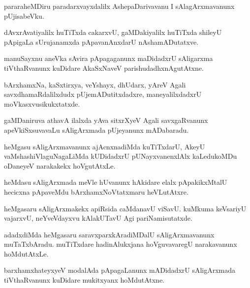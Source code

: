 \documentclass{article}
\begin{document}
\begin{mn}%
pararaheMDiru paradarxvayxdalilx AshepaDarivavanu I sAlagArxmavanunx pUjisabeVku.
\end{mn}

\begin{mn}%
dAvxrAvatiyalilx huTiTxda cakarxvU, gaMDakiyalilx huTiTxda shileyU pApigaLa sUrujanamxda 
pApavanAnxdarU nAshamADutatxve.
\end{mn}

\begin{mn}%
manuSayxnu aneVka sAvira pApagaganunx maDidadxrU sAligarxma tiVthaRvanunx kuDidare AkaSxNaveV
parishudadhxnAgutAtxne.
\end{mn}

\begin{mn}%
bArxhamxNa, kaSxtirxya, veYshayx, dhUdarx, yAreV Agali savxdhamaRdalilxdudx 
pUjemADutitxdadxre, maneyalilxdadxrU moVkasxvusikukxtatxde.
\end{mn}

\begin{mn}%
gaMDaniruva athavA ilalxda yAva sitxrXyeV Agali savxgaRvanunx apeVkiSxsuvavaLu 
sAligArxmada pUjeyanunx mADabaradu.
\end{mn}

\begin{mn}%
heMgasu sAligArxmavanunx ajAcnxnadiMda kuTiTxdarU, AkeyU vaMshashiVlaguNagaLiMda kUDidadxrU 
pUNayxvanenxlAlx kaLedukoMDu oDaneyeV narakakekx hoVgutAtxLe.
\end{mn}

\begin{mn}%
heMdasu sAligArxmada meVle hUvanunx hAkidare elalx pApakikxMtalU hecicxna pApaveMdu 
bArxhamxNoVtatxmaru heVLutAtxre.
\end{mn}

\begin{mn}%
heMgasaru sAligArxmakekx apiRsida caMdanavU viSavU. kuMkuma keVsariyU vajarxvU, 
neYveVdayxvu kAlakUTavU Agi pariNamisutatxde.
\end{mn}

\begin{mn}%
adadxdiMda heMgasaru saravxparxkAradiMDalU sAligArxmavanunx muTaTxbAradu. muTiTxdare 
hadinAlukxjana hoVguvavaregU narakavanunx hoMdutAtxLe.
\end{mn}

\begin{mn}%
barxhamxhateyxyeV modalAda pApagaLanunx mADidadxrU sAligArxmada tiVthaRvanunx kuDidare 
mukitxyanx hoMdutAtxne.
\end{mn}
\end{document}

